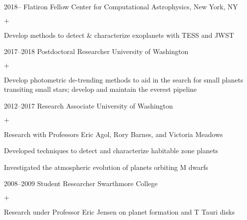 \documentclass[]{luger-cv} %
\begin{document}
\begin{entrylist}


\entry
{2018--}
{Flatiron Fellow}
{Center for Computational Astrophysics, New York, NY}
{%
\vspace{-1em}
\begin{list}{$+$}{\cvlist}
\item Develop methods to detect \& characterize exoplanets with TESS and JWST
\end{list}
}


\entry
{2017--2018}
{Postdoctoral Researcher}
{University of Washington}
{%
\vspace{-1em}
\begin{list}{$+$}{\cvlist}
\item Develop photometric de-trending methods to aid in the search for small
      planets transiting small stars; develop and maintain the everest pipeline
\end{list}
}


\entry
{2012--2017}
{Research Associate}
{University of Washington}
{%
\vspace{-1em}
\begin{list}{$+$}{\cvlist}
\item Research with Professors Eric Agol, Rory Barnes, and Victoria Meadows
\item Developed techniques to detect and characterize habitable
zone planets
\item Investigated the atmospheric evolution of planets orbiting M dwarfs
\end{list}
}


\ifdefined \onepage \else
\entry
{2008--2009}
{Student Researcher}
{Swarthmore College}
{%
\vspace{-1em}
\begin{list}{$+$}{\cvlist}
\item Research under Professor Eric Jensen on planet formation and T Tauri disks
\end{list}
}
\fi


\end{entrylist}
\end{document}
